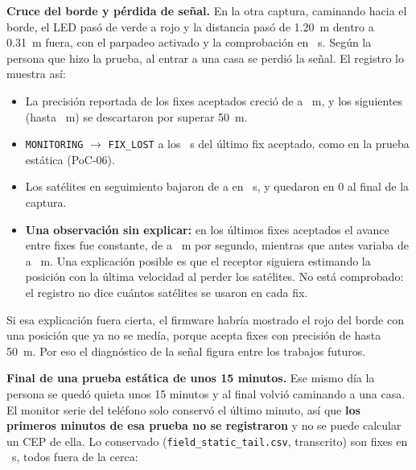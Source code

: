 \textbf{Cruce del borde y pérdida de señal.} En la otra captura, caminando hacia el borde, el LED pasó de
verde a rojo y la distancia pasó de 1.20~m dentro a 0.31~m fuera, con el parpadeo activado y la comprobación en
\dCrossCheckOutUs~\textmu s. Según la persona que hizo la prueba, al entrar a una casa se perdió la señal. El
registro lo muestra así:

\begin{itemize}
  \item La precisión reportada de los \dCrossFixes{} fixes aceptados creció de \dCrossAccFrom{} a \dCrossAccTo~m, y los
        \dCrossIgnored{} siguientes (hasta \dCrossIgnoredLast~m) se descartaron por superar 50~m.
  \item \texttt{MONITORING} $\to$ \texttt{FIX\_LOST} a los \dCrossLostS~s del último fix aceptado, como en la
        prueba estática (PoC-06).
  \item Los satélites en seguimiento bajaron de \dCrossSatsFrom{} a \dCrossSatsTo{} en \dCrossSatsSeconds~s, y
        quedaron en 0 al final de la captura.
  \item \textbf{Una observación sin explicar:} en los últimos \dCrossConstSteps{} fixes aceptados el avance entre
        fixes fue constante, de \dCrossConstLow{} a \dCrossConstHigh~m por segundo, mientras que antes variaba de
        \dCrossVarLow{} a \dCrossVarHigh~m. Una explicación posible es que el receptor siguiera estimando la
        posición con la última velocidad al perder los satélites. No está comprobado: el registro no dice
        cuántos satélites se usaron en cada fix.
\end{itemize}

Si esa explicación fuera cierta, el firmware habría mostrado el rojo del borde con una posición que ya no se
medía, porque acepta fixes con precisión de hasta 50~m. Por eso el diagnóstico de la señal figura entre los
trabajos futuros.

\textbf{Final de una prueba estática de unos 15 minutos.} Ese mismo día la persona se quedó quieta unos 15 minutos y
al final volvió caminando a una casa. El monitor serie del teléfono solo conservó el último minuto, así que
\textbf{los primeros minutos de esa prueba no se registraron} y no se puede calcular un CEP de ella. Lo conservado
(\texttt{field\_\allowbreak static\_\allowbreak tail.csv}, transcrito) son \dTailFixes{} fixes en \dTailSpanS~s, todos fuera de la cerca:

